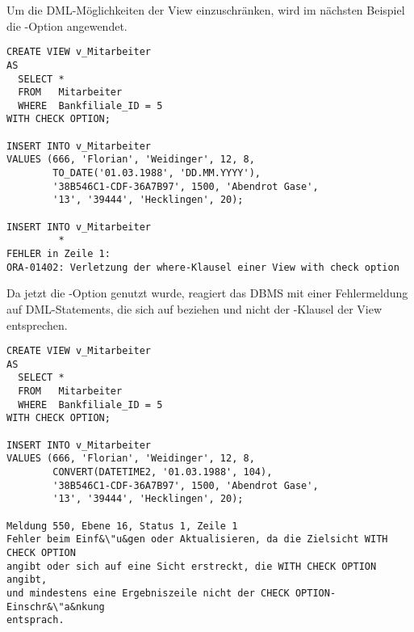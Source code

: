           Um die DML-M\"oglichkeiten der View  einzuschr\"anken, wird im n\"achsten Beispiel die -Option angewendet.
          \begin{lstlisting}[language=oracle_sql,caption={Ein Experiment mit der CHECK OPTION in Oracle},label=sql08_36]
CREATE VIEW v_Mitarbeiter
AS
  SELECT *
  FROM   Mitarbeiter
  WHERE  Bankfiliale_ID = 5
WITH CHECK OPTION;

INSERT INTO v_Mitarbeiter
VALUES (666, 'Florian', 'Weidinger', 12, 8,
        TO_DATE('01.03.1988', 'DD.MM.YYYY'),
        '38B546C1-CDF-36A7B97', 1500, 'Abendrot Gase',
        '13', '39444', 'Hecklingen', 20);

INSERT INTO v_Mitarbeiter
         *
FEHLER in Zeile 1:
ORA-01402: Verletzung der where-Klausel einer View with check option
          \end{lstlisting}
          Da jetzt die -Option genutzt wurde, reagiert das DBMS mit einer Fehlermeldung auf DML-Statements, die sich auf  beziehen und nicht der \WHERE-Klausel der View entsprechen.
          \begin{lstlisting}[language=ms_sql,caption={Ein Experiment mit der CHECK OPTION in SQL Server},label=sql08_37]
CREATE VIEW v_Mitarbeiter
AS
  SELECT *
  FROM   Mitarbeiter
  WHERE  Bankfiliale_ID = 5
WITH CHECK OPTION;

INSERT INTO v_Mitarbeiter
VALUES (666, 'Florian', 'Weidinger', 12, 8,
        CONVERT(DATETIME2, '01.03.1988', 104),
        '38B546C1-CDF-36A7B97', 1500, 'Abendrot Gase',
        '13', '39444', 'Hecklingen', 20);

Meldung 550, Ebene 16, Status 1, Zeile 1
Fehler beim Einf&\"u&gen oder Aktualisieren, da die Zielsicht WITH CHECK OPTION
angibt oder sich auf eine Sicht erstreckt, die WITH CHECK OPTION angibt,
und mindestens eine Ergebniszeile nicht der CHECK OPTION-Einschr&\"a&nkung
entsprach.
          \end{lstlisting}
